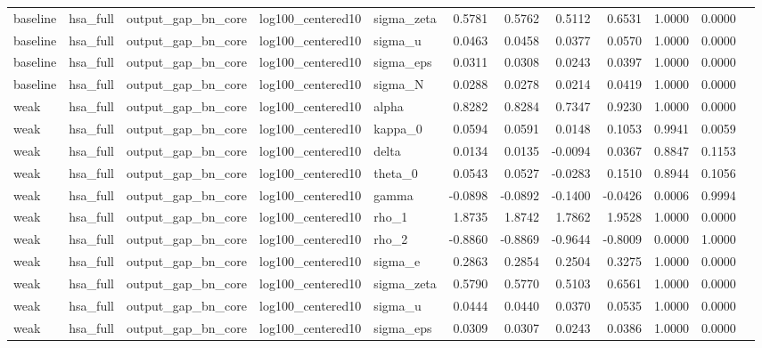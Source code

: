 \begin{tabular}{lllllrrrrrrl}
baseline & hsa\_full & output\_gap\_bn\_core & log100\_centered10 & sigma\_zeta & 0.5781 & 0.5762 & 0.5112 & 0.6531 & 1.0000 & 0.0000 &  \\
baseline & hsa\_full & output\_gap\_bn\_core & log100\_centered10 & sigma\_u & 0.0463 & 0.0458 & 0.0377 & 0.0570 & 1.0000 & 0.0000 &  \\
baseline & hsa\_full & output\_gap\_bn\_core & log100\_centered10 & sigma\_eps & 0.0311 & 0.0308 & 0.0243 & 0.0397 & 1.0000 & 0.0000 &  \\
baseline & hsa\_full & output\_gap\_bn\_core & log100\_centered10 & sigma\_N & 0.0288 & 0.0278 & 0.0214 & 0.0419 & 1.0000 & 0.0000 &  \\
weak & hsa\_full & output\_gap\_bn\_core & log100\_centered10 & alpha & 0.8282 & 0.8284 & 0.7347 & 0.9230 & 1.0000 & 0.0000 &  \\
weak & hsa\_full & output\_gap\_bn\_core & log100\_centered10 & kappa\_0 & 0.0594 & 0.0591 & 0.0148 & 0.1053 & 0.9941 & 0.0059 &  \\
weak & hsa\_full & output\_gap\_bn\_core & log100\_centered10 & delta & 0.0134 & 0.0135 & -0.0094 & 0.0367 & 0.8847 & 0.1153 &  \\
weak & hsa\_full & output\_gap\_bn\_core & log100\_centered10 & theta\_0 & 0.0543 & 0.0527 & -0.0283 & 0.1510 & 0.8944 & 0.1056 &  \\
weak & hsa\_full & output\_gap\_bn\_core & log100\_centered10 & gamma & -0.0898 & -0.0892 & -0.1400 & -0.0426 & 0.0006 & 0.9994 &  \\
weak & hsa\_full & output\_gap\_bn\_core & log100\_centered10 & rho\_1 & 1.8735 & 1.8742 & 1.7862 & 1.9528 & 1.0000 & 0.0000 &  \\
weak & hsa\_full & output\_gap\_bn\_core & log100\_centered10 & rho\_2 & -0.8860 & -0.8869 & -0.9644 & -0.8009 & 0.0000 & 1.0000 &  \\
weak & hsa\_full & output\_gap\_bn\_core & log100\_centered10 & sigma\_e & 0.2863 & 0.2854 & 0.2504 & 0.3275 & 1.0000 & 0.0000 &  \\
weak & hsa\_full & output\_gap\_bn\_core & log100\_centered10 & sigma\_zeta & 0.5790 & 0.5770 & 0.5103 & 0.6561 & 1.0000 & 0.0000 &  \\
weak & hsa\_full & output\_gap\_bn\_core & log100\_centered10 & sigma\_u & 0.0444 & 0.0440 & 0.0370 & 0.0535 & 1.0000 & 0.0000 &  \\
weak & hsa\_full & output\_gap\_bn\_core & log100\_centered10 & sigma\_eps & 0.0309 & 0.0307 & 0.0243 & 0.0386 & 1.0000 & 0.0000 &  \\

\end{tabular}
